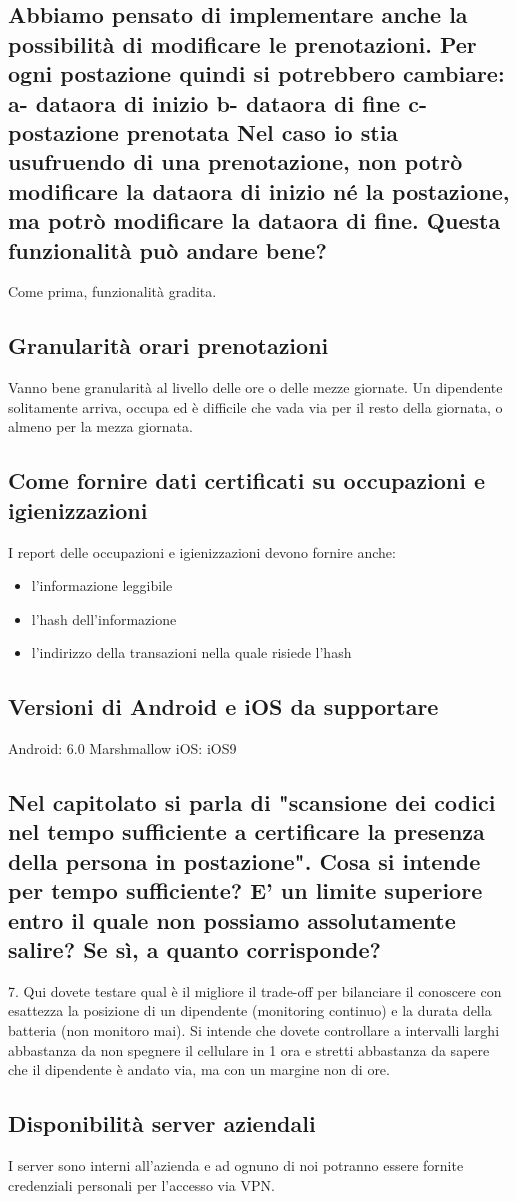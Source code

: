 \subsection*{Abbiamo pensato di implementare anche la possibilità di modificare le prenotazioni. Per ogni postazione quindi si potrebbero cambiare: a- dataora di inizio b- dataora di fine	c- postazione prenotata	Nel caso io stia usufruendo di una prenotazione, non potrò modificare la dataora di inizio né la postazione, ma potrò modificare la dataora di fine.	Questa funzionalità può andare bene?}
Come prima, funzionalità gradita.


\subsection*{Granularità orari prenotazioni}
Vanno bene granularità al livello delle ore o delle mezze giornate.
Un dipendente solitamente arriva, occupa ed è difficile che vada via per il resto della giornata, o almeno per la mezza giornata.



\subsection*{Come fornire dati certificati su occupazioni e igienizzazioni}
I report delle occupazioni e igienizzazioni devono fornire anche:
\begin{itemize}
	\item l'informazione leggibile
	\item l'hash dell'informazione
	\item l'indirizzo della transazioni nella quale risiede l'hash
\end{itemize}

\subsection*{Versioni di Android e iOS da supportare}
Android: 6.0 Marshmallow
iOS: iOS9


\subsection*{Nel capitolato si parla di "scansione dei codici nel tempo sufficiente a certificare la presenza della persona in postazione". Cosa si intende per tempo sufficiente? E' un limite superiore entro il quale non possiamo assolutamente salire? Se sì, a quanto corrisponde?}
7. Qui dovete testare qual è il migliore il trade-off per bilanciare il conoscere con esattezza la posizione di un dipendente (monitoring continuo) e la durata della batteria (non monitoro mai). Si intende che dovete controllare a intervalli larghi abbastanza da non spegnere il cellulare in 1 ora e stretti abbastanza da sapere che il dipendente è andato via, ma con un margine non di ore.


\subsection*{Disponibilità server aziendali}
I server sono interni all'azienda e ad ognuno di noi potranno essere fornite credenziali personali per l'accesso via VPN.




